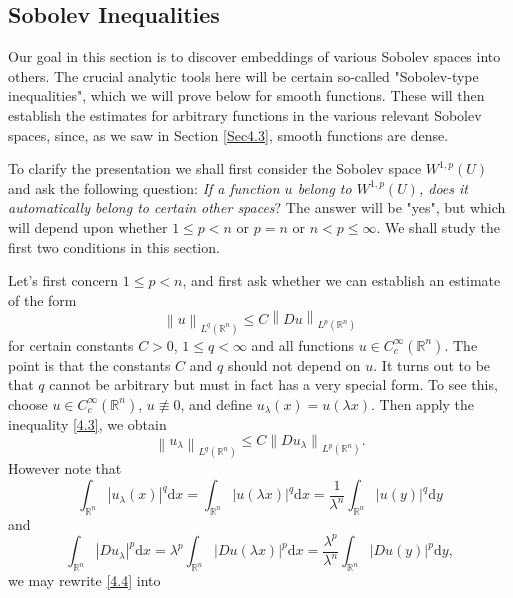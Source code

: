 \subsection{Sobolev Inequalities}
Our goal in this section is to discover embeddings of various Sobolev spaces into others. The crucial analytic tools here will be certain so-called "Sobolev-type inequalities", which we will prove below for smooth functions. These will then establish the estimates for arbitrary functions in the various relevant Sobolev spaces, since, as we saw in Section \ref{Sec4.3}, smooth functions are dense.\par
To clarify the presentation we shall first consider the Sobolev space $W^{1,p}(U)$ and ask the following question: \textit{If a function $u$ belong to $W^{1,p}(U)$, does it automatically belong to certain other spaces}? The answer will be "yes", but which will depend upon whether $1\le p<n$ or $p=n$ or $n<p\le\infty$. We shall study the first two conditions in this section.\par
Let's first concern $1\le p<n$, and first ask whether we can establish an estimate of the form 
\begin{equation}\label{4.3}
\left\| u \right\| _{L^q\left( \mathbb{R} ^n \right)}\le C\left\| Du \right\| _{L^p\left( \mathbb{R} ^n \right)}
\end{equation}
for certain constants $C>0$, $1\le q<\infty$ and all functions $u\in C_c^\infty(\mathbb{R}^n)$. The point is that the constants $C$ and $q$ should not depend on $u$. It turns out to be that $q$ cannot be arbitrary but must in fact has a very special form. To see this, choose $u\in C_c^\infty(\mathbb{R}^n)$, $u\not\equiv 0$, and define $u_\lambda(x)=u(\lambda x)$. Then apply the inequality \eqref{4.3}, we obtain 
\begin{equation}\label{4.4}
\left\| u_{\lambda} \right\| _{L^q\left( \mathbb{R} ^n \right)}\le C\left\| Du_{\lambda} \right\| _{L^p\left( \mathbb{R} ^n \right)}.
\end{equation}
However note that 
$$
\int_{\mathbb{R} ^n}{\left| u_{\lambda}\left( x \right) \right|^q\mathrm{d}x}=\int_{\mathbb{R} ^n}{\left| u\left( \lambda x \right) \right|^q\mathrm{d}x}=\frac{1}{\lambda ^n}\int_{\mathbb{R} ^n}{\left| u\left( y \right) \right|^q\mathrm{d}y}
$$
and 
$$
\int_{\mathbb{R} ^n}{\left| Du_{\lambda} \right|^p\mathrm{d}x}=\lambda ^p\int_{\mathbb{R} ^n}{\left| Du\left( \lambda x \right) \right|^p\mathrm{d}x}=\frac{\lambda ^p}{\lambda ^n}\int_{\mathbb{R} ^n}{\left| Du\left( y \right) \right|^p\mathrm{d}y},
$$
we may rewrite \eqref{4.4} into 
